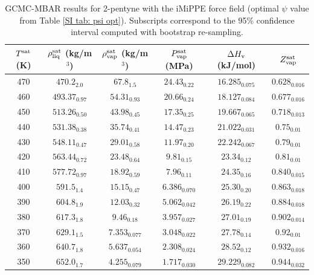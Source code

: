 \documentclass[journal=jctc,manuscript=article]{achemso}
\begin{document}
\begin{table}[htb!]
	\caption{GCMC-MBAR results for 2-pentyne with the iMiPPE force field (optimal $\psi$ value from Table \ref{SI tab: psi opt}). Subscripts correspond to the 95\% confidence interval computed with bootstrap re-sampling.}
	\begin{center}
		\begin{tabular}{|c|c|c|c|c|c|}
			\hline
			$T^{\rm sat}$ (K) & $\rho_{\rm liq}^{\rm sat}$ (kg/m$^3$) & $\rho_{\rm vap}^{\rm sat}$ (kg/m$^3$) & $P_{\rm vap}^{\rm sat}$ (MPa) & $\Delta H_{\rm v}$ (kJ/mol) & $Z_{\rm vap}^{\rm sat}$ \\ \hline
			470 & $470.2_{2.0}$ & $67.8_{1.5}$ & $24.43_{0.22}$ & $16.285_{0.075}$ & $0.628_{0.016}$ \\
			460 & $493.37_{0.97}$ & $54.31_{0.93}$ & $20.66_{0.24}$ & $18.127_{0.084}$ & $0.677_{0.016}$ \\
			450 & $513.26_{0.50}$ & $43.98_{0.45}$ & $17.35_{0.25}$ & $19.667_{0.065}$ & $0.718_{0.013}$ \\
			440 & $531.38_{0.38}$ & $35.74_{0.41}$ & $14.47_{0.23}$ & $21.022_{0.031}$ & $0.75_{0.01}$ \\
			430 & $548.11_{0.47}$ & $29.01_{0.58}$ & $11.97_{0.20}$ & $22.242_{0.067}$ & $0.79_{0.01}$ \\
			420 & $563.44_{0.72}$ & $23.48_{0.64}$ & $9.81_{0.15}$ & $23.34_{0.12}$ & $0.81_{0.01}$ \\
			410 & $577.72_{0.97}$ & $18.92_{0.59}$ & $7.96_{0.11}$ & $24.35_{0.16}$ & $0.840_{0.015}$ \\
			400 & $591.5_{1.4}$ & $15.15_{0.47}$ & $6.386_{0.070}$ & $25.30_{0.20}$ & $0.863_{0.018}$ \\
			390 & $604.8_{1.9}$ & $12.03_{0.32}$ & $5.062_{0.042}$ & $26.19_{0.22}$ & $0.884_{0.018}$ \\
			380 & $617.3_{1.8}$ & $9.46_{0.18}$ & $3.957_{0.027}$ & $27.01_{0.19}$ & $0.902_{0.014}$ \\
			370 & $629.1_{1.5}$ & $7.353_{0.077}$ & $3.048_{0.022}$ & $27.78_{0.14}$ & $0.92_{0.01}$ \\
			360 & $640.7_{1.8}$ & $5.637_{0.054}$ & $2.308_{0.024}$ & $28.52_{0.12}$ & $0.932_{0.016}$ \\
			350 & $652.0_{1.7}$ & $4.255_{0.079}$ & $1.717_{0.030}$ & $29.229_{0.082}$ & $0.944_{0.032}$ \\
			\hline
		\end{tabular}
	\end{center}
\end{table}
\end{document}
